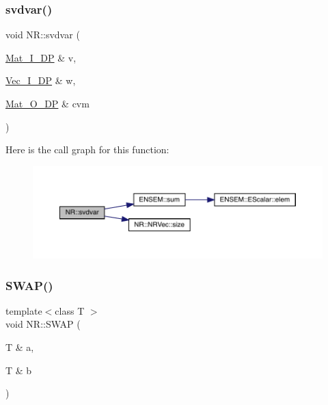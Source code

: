 \subsubsection{\texorpdfstring{svdvar()}{svdvar()}}
{\footnotesize\ttfamily void N\+R\+::svdvar (\begin{DoxyParamCaption}\item[{\mbox{\hyperlink{namespaceNR_a2b8abfda8fffad6ba0a1b5a4c0773dbf}{Mat\+\_\+\+I\+\_\+\+DP}} \&}]{v,  }\item[{\mbox{\hyperlink{namespaceNR_a9f943da53862537c552e2a770cb170ae}{Vec\+\_\+\+I\+\_\+\+DP}} \&}]{w,  }\item[{\mbox{\hyperlink{namespaceNR_adc1f8da33094b6bbeb1f5f899515ce54}{Mat\+\_\+\+O\+\_\+\+DP}} \&}]{cvm }\end{DoxyParamCaption})}

Here is the call graph for this function\+:
\nopagebreak
\begin{figure}[H]
\begin{center}
\leavevmode
\includegraphics[width=350pt]{da/d46/namespaceNR_a7718198c5af1e10344d7c8933fe579c5_cgraph}
\end{center}
\end{figure}
\mbox{\label{namespaceNR_af3d3d41b75c1e0ce80f32a6c45576db3}} 
\subsubsection{\texorpdfstring{SWAP()}{SWAP()}}
{\footnotesize\ttfamily template$<$class T $>$ \\
void N\+R\+::\+S\+W\+AP (\begin{DoxyParamCaption}\item[{T \&}]{a,  }\item[{T \&}]{b }\end{DoxyParamCaption})\hspace{0.3cm}{\ttfamily [inline]}}

